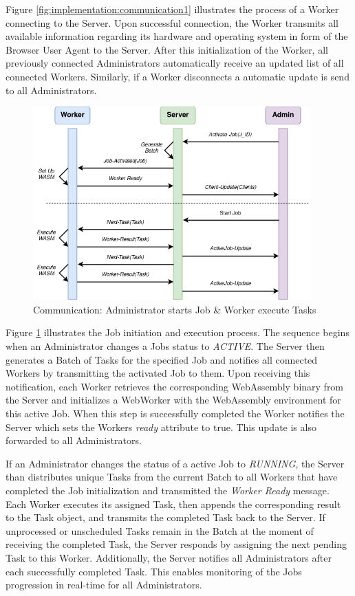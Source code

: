 Figure \ref{fig:implementation:communication1} illustrates the process of a Worker connecting to the Server. Upon successful connection, the Worker transmits all available information regarding its hardware and operating system in form of the Browser User Agent to the Server. After this initialization of the Worker, all previously connected Administrators automatically receive an updated list of all connected Workers. Similarly, if a Worker disconnects a automatic update is send to all Administrators.

\begin{figure}[htbp]
    \centering
    \includegraphics[width=0.95\textwidth]{gfx/figures/communication-jobexecution.png}
    \caption{Communication: Administrator starts Job \& Worker execute Tasks}
    \label{fig:implementation:communication2}
\end{figure}

Figure \ref{fig:implementation:communication2} illustrates the Job initiation and execution process. The sequence begins when an Administrator changes a Jobs status to \emph{ACTIVE}. The Server then generates a Batch of Tasks for the specified Job and notifies all connected Workers by transmitting the activated Job to them. Upon receiving this notification, each Worker retrieves the corresponding WebAssembly binary from the Server and initializes a WebWorker with the WebAssembly environment for this active Job. When this step is successfully completed the Worker notifies the Server which sets the Workers \emph{ready} attribute to true. This update is also forwarded to all Administrators.

If an Administrator changes the status of a active Job to \emph{RUNNING}, the Server than distributes unique Tasks from the current Batch to all Workers that have completed the Job initialization and transmitted the \emph{Worker Ready} message. Each Worker executes its assigned Task, then appends the corresponding result to the Task object, and transmits the completed Task back to the Server. If unprocessed or unscheduled Tasks remain in the Batch at the moment of receiving the completed Task, the Server responds by assigning the next pending Task to this Worker. Additionally, the Server notifies all Administrators after each successfully completed Task. This enables monitoring of the Jobs progression in real-time for all Administrators.

